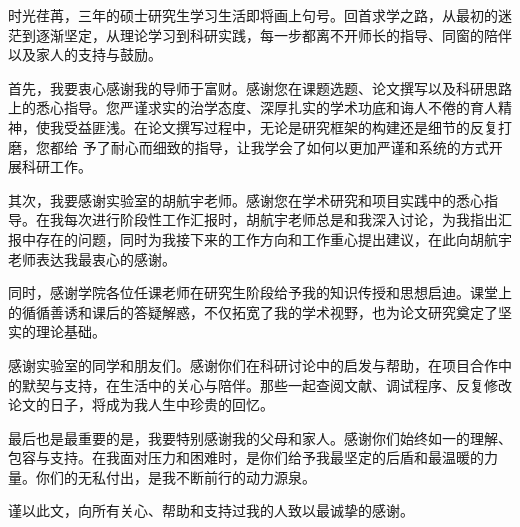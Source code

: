 \documentclass[master, vlined]{DissertUESTC}
\begin{document}
	
	\acknowledgement
	

	时光荏苒，三年的硕士研究生学习生活即将画上句号。回首求学之路，从最初的迷茫到逐渐坚定，从理论学习到科研实践，每一步都离不开师长的指导、同窗的陪伴以及家人的支持与鼓励。

	首先，我要衷心感谢我的导师于富财。感谢您在课题选题、论文撰写以及科研思路上的悉心指导。您严谨求实的治学态度、深厚扎实的学术功底和诲人不倦的育人精神，使我受益匪浅。在论文撰写过程中，无论是研究框架的构建还是细节的反复打磨，您都给	予了耐心而细致的指导，让我学会了如何以更加严谨和系统的方式开展科研工作。
	
	其次，我要感谢实验室的胡航宇老师。感谢您在学术研究和项目实践中的悉心指导。在我每次进行阶段性工作汇报时，胡航宇老师总是和我深入讨论，为我指出汇报中存在的问题，同时为我接下来的工作方向和工作重心提出建议，在此向胡航宇老师表达我最衷心的感谢。

	同时，感谢学院各位任课老师在研究生阶段给予我的知识传授和思想启迪。课堂上的循循善诱和课后的答疑解惑，不仅拓宽了我的学术视野，也为论文研究奠定了坚实的理论基础。

	感谢实验室的同学和朋友们。感谢你们在科研讨论中的启发与帮助，在项目合作中的默契与支持，在生活中的关心与陪伴。那些一起查阅文献、调试程序、反复修改论文的日子，将成为我人生中珍贵的回忆。

	最后也是最重要的是，我要特别感谢我的父母和家人。感谢你们始终如一的理解、包容与支持。在我面对压力和困难时，是你们给予我最坚定的后盾和最温暖的力量。你们的无私付出，是我不断前行的动力源泉。

	谨以此文，向所有关心、帮助和支持过我的人致以最诚挚的感谢。


	
	
	
	
	
\end{document}
